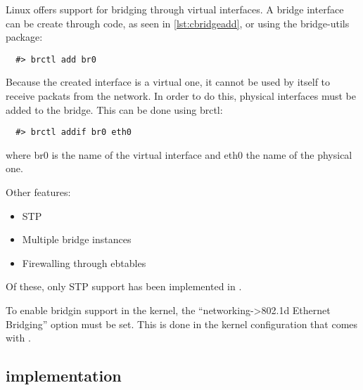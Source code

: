 Linux offers support for bridging through virtual interfaces.
A bridge interface can be create through code, as seen in 
\ref{lst:cbridgeadd}, or using the bridge-utils package:
\lstset{language=zsh,caption=Adding a bridge interface,label=lst:sbridgeadd}
\begin{lstlisting}
  #> brctl add br0
\end{lstlisting}
Because the created interface is a virtual one, it cannot be
used by itself to receive packats from the network. In order 
to do this, physical interfaces must be added to the bridge. This 
can be done using brctl:
\lstset{language=zsh,caption=Adding a bridge interface,label=lst:sportadd}
\begin{lstlisting}
  #> brctl addif br0 eth0
\end{lstlisting}
where br0 is the name of the virtual interface and eth0 the 
name of the physical one.

Other features:
\begin{itemize}
  \item STP
  \item Multiple bridge instances
  \item Firewalling through ebtables
\end{itemize}
Of these, only STP support has been implemented in \textbf{\project}.

To enable bridgin support in the kernel, the ``networking->802.1d Ethernet Bridging'' option
must be set. This is done in the kernel configuration that comes with \textbf{\project}.

\subsection{\text{\project} implementation}
\label{sub-sec:switch-lkl}


